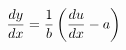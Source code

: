 \documentclass[preview]{standalone}
\begin{document}
\begin{align*}
\special{dvisvgm:raw <g id='unique000'>}\frac{dy}{dx} = \frac{1}{b}\left( \frac{du}{dx} - a \right)\special{dvisvgm:raw </g>}
\end{align*}
\end{document}
